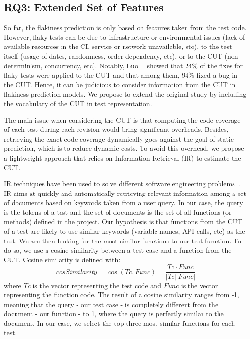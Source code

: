 \subsection{RQ3: Extended Set of Features}
So far, the flakiness prediction is only based on features taken from the test code. 
However, flaky tests can be due to infrastructure or environmental issues (\eg lack of available resources in the CI, service or network unavailable, etc), to the test itself (\eg usage of dates, randomness, order dependency, etc), or to the CUT (\eg non-determinism, concurrency, etc). 
Notably, Luo~\etal~\cite{Luo2014} showed that 24\% of the fixes for flaky tests were applied to the CUT and that among them, 94\% fixed a bug in the CUT. 
Hence, it can be judicious to consider information from the CUT in flakiness prediction models. We propose to extend the original study by including the vocabulary of the CUT in test representation.

The main issue when considering the CUT is that computing the code coverage of each test during each revision would bring significant overheads. 
Besides, retrieving the exact code coverage dynamically goes against the goal of static prediction, which is to reduce dynamic costs.
To avoid this overhead, we propose a lightweight approach that relies on Information Retrieval (IR) to estimate the CUT. 

IR techniques have been used to solve different software engineering problems~\cite{Saha2014,Palomba2018,Azizi2018}. 
IR aims at quickly and automatically retrieving relevant information among a set of documents based on keywords taken from a user query. 
In our case, the query is the tokens of a test and the set of documents is the set of all functions (or methods) defined in the project. 
Our hypothesis is that functions from the CUT of a test are likely to use similar keywords (\ie variable names, API calls, etc) as the test. We are then looking for the most similar functions to our test function. To do so, we use a cosine similarity between a test case and a function from the CUT. Cosine similarity is defined with: 
\[cosSimilarity = \cos (Tc, Func) = \frac{Tc \cdot Func}{|Tc| |Func|}\]
where $Tc$ is the vector representing the test code and $Func$ is the vector representing the function code.
The result of a cosine similarity ranges from -1, meaning that the query - our test case - is completely different from the document - our function - to 1, where the query is perfectly similar to the document. 
In our case, we select the top three most similar functions for each test. 

